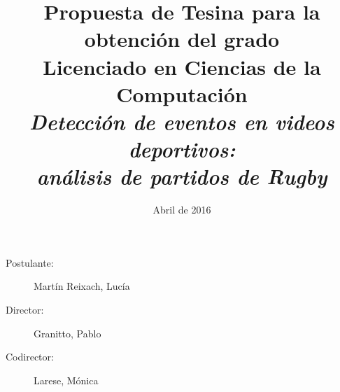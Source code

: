 \documentclass[10pt]{article}
\begin{document}
\date{Abril de 2016}
\title{Propuesta de Tesina para la obtención del grado\\Licenciado en Ciencias de la Computación
\\\textit{Detección de eventos en videos deportivos:\\análisis de partidos de Rugby}}

\maketitle

\begin{description}
  \item[Postulante:] Martín Reixach, Lucía
  \item[Director:] Granitto, Pablo
  \item[Codirector:] Larese, Mónica
\end{description}











\nocite{poppe2010survey, yang2007evaluating, csurka2004visual}
\printbibliography

%
\end{document}
